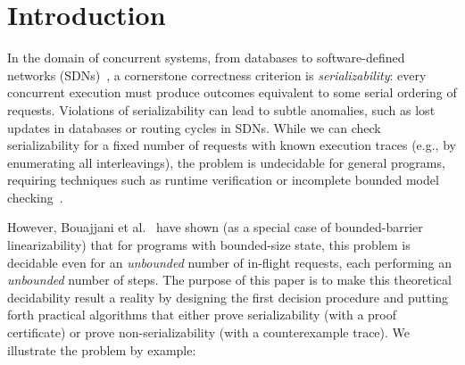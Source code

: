\section{Introduction}
\label{sec:introduction}

In the domain of concurrent systems, from databases to software-defined networks (SDNs)~\cite{KrRaVePaRoAzUh14,XiWeFoNiXi15}, a cornerstone correctness criterion is \emph{serializability}: every concurrent execution must produce outcomes equivalent to some serial ordering of requests. Violations of serializability can lead to subtle anomalies, such as lost updates in databases or routing cycles in SDNs.
While we can check serializability for a fixed number of requests with known execution traces (e.g., by enumerating all interleavings), the problem is undecidable for general programs, requiring techniques such as runtime verification or incomplete bounded model checking~\cite{WaSt06a,WaSt06b,FlFrYi08,FaMa08,SiMaWaGu11a,SiMaWaGu11b,Pa79,AlMcPe96,BiEn19}.

However, Bouajjani et al.~\cite{BoEmEnHa13} have shown (as a special case of bounded-barrier linearizability) that for programs with bounded-size state, this problem is decidable even for an \emph{unbounded} number of in-flight requests, each performing an \emph{unbounded} number of steps. The purpose of this paper is to make this theoretical decidability result a reality by designing the first decision procedure and putting forth practical algorithms that either prove serializability (with a proof certificate) or prove non-serializability (with a counterexample trace).
% 
We illustrate the problem by example:


